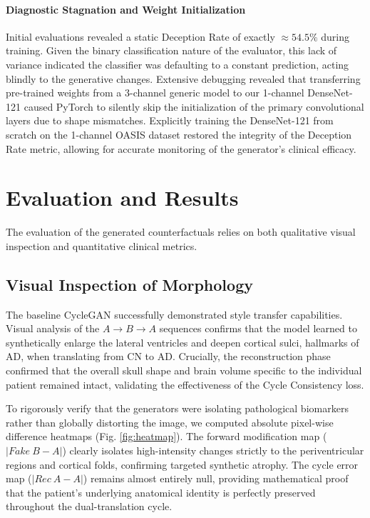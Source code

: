 \documentclass[conference]{IEEEtran}
\begin{document}
\paragraph{Diagnostic Stagnation and Weight Initialization}
Initial evaluations revealed a static Deception Rate of exactly $\approx 54.5\%$ during training. Given the binary classification nature of the evaluator, this lack of variance indicated the classifier was defaulting to a constant prediction, acting blindly to the generative changes. Extensive debugging revealed that transferring pre-trained weights from a 3-channel generic model to our 1-channel DenseNet-121 caused PyTorch to silently skip the initialization of the primary convolutional layers due to shape mismatches. Explicitly training the DenseNet-121 from scratch on the 1-channel OASIS dataset restored the integrity of the Deception Rate metric, allowing for accurate monitoring of the generator's clinical efficacy.

\section{Evaluation and Results}

The evaluation of the generated counterfactuals relies on both qualitative visual inspection and quantitative clinical metrics.

\subsection{Visual Inspection of Morphology}
The baseline CycleGAN successfully demonstrated style transfer capabilities. Visual analysis of the $A \to B \to A$ sequences confirms that the model learned to synthetically enlarge the lateral ventricles and deepen cortical sulci, hallmarks of AD, when translating from CN to AD. Crucially, the reconstruction phase confirmed that the overall skull shape and brain volume specific to the individual patient remained intact, validating the effectiveness of the Cycle Consistency loss.

To rigorously verify that the generators were isolating pathological biomarkers rather than globally distorting the image, we computed absolute pixel-wise difference heatmaps (Fig. \ref{fig:heatmap}). The forward modification map ($|Fake~B - A|$) clearly isolates high-intensity changes strictly to the periventricular regions and cortical folds, confirming targeted synthetic atrophy. The cycle error map ($|Rec~A - A|$) remains almost entirely null, providing mathematical proof that the patient's underlying anatomical identity is perfectly preserved throughout the dual-translation cycle.
\end{document}
